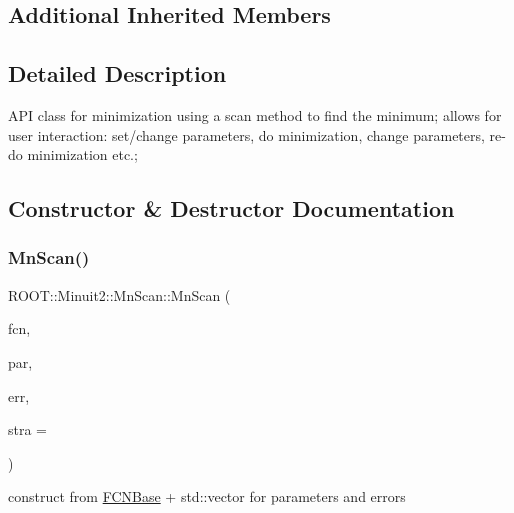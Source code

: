 \subsection*{Additional Inherited Members}


\subsection{Detailed Description}
A\+PI class for minimization using a scan method to find the minimum; allows for user interaction\+: set/change parameters, do minimization, change parameters, re-\/do minimization etc.; 

\subsection{Constructor \& Destructor Documentation}
\mbox{\label{classROOT_1_1Minuit2_1_1MnScan_a377822c78ab78d995bc0a710dbc0c426}} 
\subsubsection{\texorpdfstring{MnScan()}{MnScan()}\hspace{0.1cm}{\footnotesize\ttfamily [1/14]}}
{\footnotesize\ttfamily R\+O\+O\+T\+::\+Minuit2\+::\+Mn\+Scan\+::\+Mn\+Scan (\begin{DoxyParamCaption}\item[{const \mbox{\hyperlink{classROOT_1_1Minuit2_1_1FCNBase}{F\+C\+N\+Base}} \&}]{fcn,  }\item[{const std\+::vector$<$ double $>$ \&}]{par,  }\item[{const std\+::vector$<$ double $>$ \&}]{err,  }\item[{unsigned int}]{stra = {} }\end{DoxyParamCaption})\hspace{0.3cm}{\ttfamily [inline]}}



construct from \mbox{\hyperlink{classROOT_1_1Minuit2_1_1FCNBase}{F\+C\+N\+Base}} + std\+::vector for parameters and errors 

\mbox{\label{classROOT_1_1Minuit2_1_1MnScan_a293bc22ed5bd5755f4c1d7256c1936ab}} 
